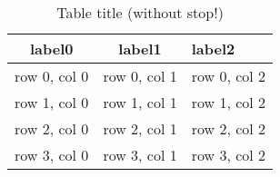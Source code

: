 \begin{table}
	\caption{Table title (without stop!)}
	\centering
	\begin{tabular}{ccl}
		\toprule
		\textbf{label0} & \textbf{label1} & \textbf{label2} \\
		\midrule
		row 0, col 0 & row 0, col 1 & row 0, col 2 \\
		row 1, col 0 & row 1, col 1 & row 1, col 2 \\ 
		row 2, col 0 & row 2, col 1 & row 2, col 2 \\ 
		row 3, col 0 & row 3, col 1 & row 3, col 2 \\
		\bottomrule
	\end{tabular}
	\label{tab:example2}
\end{table}
